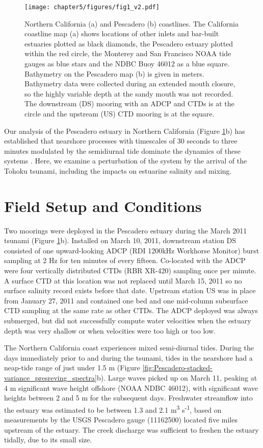 \begin{figure}
\texttt{[image: chapter5/figures/fig1\_v2.pdf]}\protect\caption{Northern California (a) and Pescadero (b) coastlines. The California
coastline map (a) shows locations of other inlets and bar-built estuaries
plotted as black diamonds, the Pescadero estuary plotted within the
red circle, the Monterey and San Francisco NOAA tide gauges as blue
stars and the NDBC Buoy 46012 as a blue square. Bathymetry on the
Pescadero map (b) is given in meters. Bathymetry data were collected
during an extended mouth closure, so the highly variable depth at
the sandy mouth was not recorded. The downstream (DS) mooring with
an ADCP and CTDs is at the circle and the upstream (US) CTD mooring
is at the square. \label{fig:coastline_map_with_inlets}}
\end{figure}

Our analysis of the Pescadero estuary in Northern California (Figure
\ref{fig:coastline_map_with_inlets}b) has established that nearshore
processes with timescales of 30 seconds to three minutes modulated
by the semidiurnal tide dominate the dynamics of these systems \citep{williams_stacey_inprep}.
Here, we examine a perturbation of the system by the arrival of the
Tohoku tsunami, including the impacts on estuarine salinity and mixing. 


\section{Field Setup and Conditions}

Two moorings were deployed in the Pescadero estuary during the March
2011 tsunami (Figure \ref{fig:coastline_map_with_inlets}b). Installed
on March 10, 2011, downstream station DS consisted of one upward-looking
ADCP (RDI 1200kHz Workhorse Monitor) burst sampling at 2 Hz for ten
minutes of every fifteen. Co-located with the ADCP were four vertically
distributed CTDs (RBR XR-420) sampling once per minute. A surface
CTD at this location was not replaced until March 15, 2011 so no surface
salinity record exists before that date. Upstream station US was in
place from January 27, 2011 and contained one bed and one mid-column
subsurface CTD sampling at the same rate as other CTDs. The ADCP deployed
was always submerged, but did not successfully compute water velocities
when the estuary depth was very shallow or when velocities were too
high\emph{ }or too low. 

The Northern California coast experiences mixed semi-diurnal tides.
During the days immediately prior to and during the tsunami, tides
in the nearshore had a neap-tide range of just under\emph{ }1.5 m
(Figure \ref{fig:Pescadero-stacked-variance_presreving_spectra}b).
Large waves picked up on March 11, peaking at 4 m significant wave
height offshore (NOAA NDBC 46012), with significant wave heights between
2 and 5 m for the subsequent days\emph{. }Freshwater streamflow into
the estuary was estimated to be between 1.3 and 2.1 m\textsuperscript{3}
s\textsuperscript{-1}, based on measurements by the USGS Pescadero
gauge (11162500) located five miles upstream of the estuary.\emph{
}The creek discharge was sufficient to freshen the estuary tidally,
due to its small size. 

